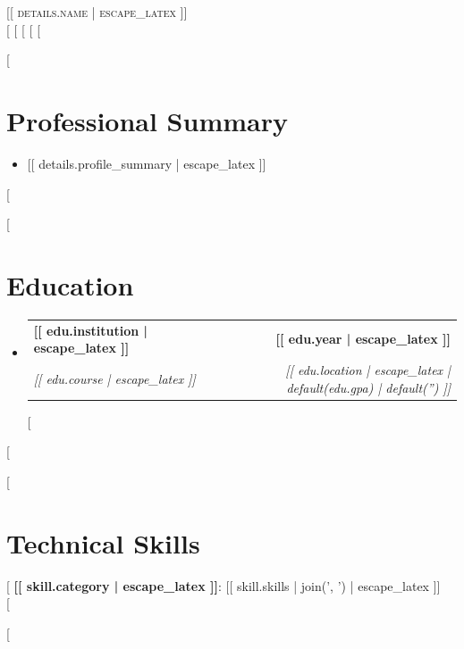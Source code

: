 \documentclass[letterpaper,11pt]{article}
\makeatletter
\newcommand{\resumeItem}[1]{
  \item\small{{#1 \vspace{-2pt}}}
}
\newcommand{\resumeSubheading}[4]{
  \vspace{-2pt}\item
    \begin{tabular*}{1.0\textwidth}[t]{l@{\extracolsep{\fill}}r}
      \textbf{#1} & \textbf{\small #2} \\
      \textit{\small#3} & \textit{\small #4} \\
    \end{tabular*}\vspace{-7pt}
}
\newcommand{\resumeSubHeadingListStart}{\begin{itemize}[leftmargin=0.0in, label={}]}
\newcommand{\resumeSubHeadingListEnd}{\end{itemize}}
\makeatother
\begin{document}
\begin{center}
    {\Huge \scshape [[ details.name | escape_latex ]] } \\ \vspace{1pt}
    \small 
    [%
    [%
    [%
    [%
    [%
    \vspace{-8pt}
\end{center}

[%
\section{Professional Summary}
  \resumeSubHeadingListStart
    \resumeItem{[[ details.profile_summary | escape_latex ]]}
  \resumeSubHeadingListEnd
[%

[%
\section{Education}
  \resumeSubHeadingListStart
    [%
    \resumeSubheading
      {[[ edu.institution | escape_latex ]]}{[[ edu.year | escape_latex ]]}
      {[[ edu.course | escape_latex ]]}{[[ edu.location | escape_latex | default(edu.gpa) | default('') ]]}
    [%
  \resumeSubHeadingListEnd
[%

[%
\section{Technical Skills}
 \begin{itemize}[leftmargin=0.15in, label={}]
    \small{\item{
     [%
     \textbf{[[ skill.category | escape_latex ]]}{: [[ skill.skills | join(', ') | escape_latex ]]} \\
     [%
 }}
 \end{itemize}
 \vspace{-16pt}
[%
\end{document}
